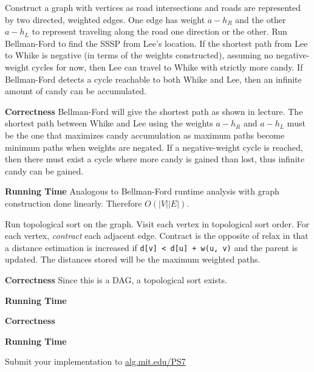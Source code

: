 \documentclass[12pt,twoside]{article}
\begin{document}
\begin{problems}
\newpage

\problem

 Construct a graph with vertices as road
intersections and roads are represented by two directed, weighted edges. One
edge has weight $a - h_R$ and the other $a - h_L$ to represent traveling
along the road one direction or the other. Run Bellman-Ford to find the SSSP
from Lee's location. If the shortest path from Lee to Whike is negative (in
terms of the weights constructed), assuming no negative-weight cycles for
now, then Lee can travel to Whike with strictly more candy. If Bellman-Ford
detects a cycle reachable to both Whike and Lee, then an infinite amount of
candy can be accumulated.

{\bf Correctness} Bellman-Ford will give the shortest path as shown in
lecture. The shortest path between Whike and Lee using the weights $a - h_R$
and $a - h_L$ must be the one that maximizes candy accumulation as maximum
paths become minimum paths when weights are negated. If a negative-weight
cycle is reached, then there must exist a cycle where more candy is gained
than lost, thus infinite candy can be gained.

{\bf Running Time} Analogous to Bellman-Ford runtime analysis with graph
construction done linearly. Therefore $O(|V||E|)$.

\newpage

\problem

\begin{problemparts}

 Run topological sort on the graph. Visit each
vertex in topological sort order. For each vertex, {\it contract} each
adjacent edge. Contract is the opposite of relax in that a distance
estimation is increased if {\tt d[v] < d[u] + w(u, v)} and the parent is
updated. The distances stored will be the maximum weighted paths.

{\bf Correctness} Since this is a DAG, a topological sort exists.

{\bf Running Time} 


{\bf Correctness}

{\bf Running Time}

\problempart Submit your implementation to {\small\url{alg.mit.edu/PS7}}

\end{problemparts}

\end{problems}
\end{document}
